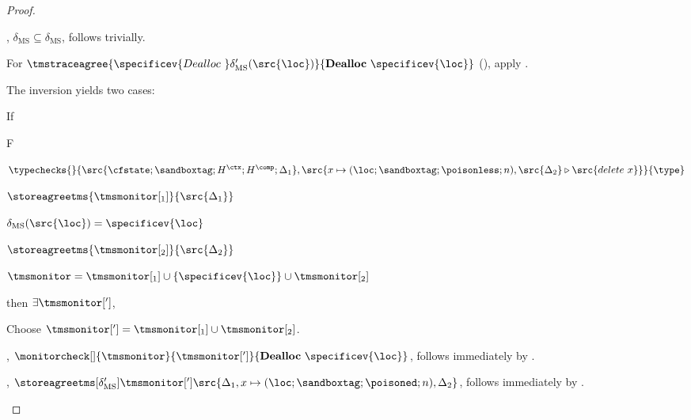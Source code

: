 \documentclass[a4paper,names,dvipsnames]{article}
\begin{document}
\begin{proof}
\begin{description}
      , $\delta_{\text{MS}}\subseteq\delta_{\text{MS}}$, follows trivially.

        For $\tmstraceagree{\specificev{Dealloc\ }\delta_{\text{MS}}'(\src{\loc})}{\textbf{Dealloc}\ \specificev{\loc}}$ (), apply .

      The inversion yields two cases:
      \begin{description}
        If
        \begin{passumptions}{F}
        \item $\typechecks{}{\src{\cfstate;\sandboxtag;H^{\ctx};H^{\comp};\Delta_1},\src{x\mapsto(\loc;\sandboxtag;\poisonless;n),\src{\Delta_2}\triangleright \src{delete\ x}}}{\type}$
        \item $\storeagreetms{\tmsmonitor[_1]}{\src{\Delta_1}}$
        \item $\delta_{\text{MS}}(\src{\loc})=\specificev{\loc}$
        \item $\storeagreetms{\tmsmonitor[_2]}{\src{\Delta_2}}$
        \item $\tmsmonitor=\tmsmonitor[_1]\cup\left\{\specificev{\loc}\right\}\cup \tmsmonitor[_2]$
        \end{passumptions}
        then $\exists \tmsmonitor[']$,
        Choose $\tmsmonitor[']=\tmsmonitor[_1]\cup \tmsmonitor[_2]$.

        , $\monitorcheck[]{\tmsmonitor}{\tmsmonitor[']}{\textbf{Dealloc}\ \specificev{\loc}}$, follows immediately by .

        , $\storeagreetms[\delta_{\text{MS}}']{\tmsmonitor[']}{\src{\Delta_1,x\mapsto(\loc;\sandboxtag;\poisoned;n),\Delta_2}}$, follows immediately by .


\end{description}
\end{description}
\end{proof}
\end{document}
